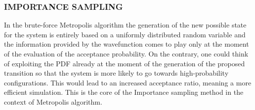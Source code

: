 \subsubsection{IMPORTANCE SAMPLING}
In the brute-force Metropolis algorithm the generation of the new possible state for the system is entirely based on a uniformly distributed random variable and the information provided by the wavefunction comes to play only at the moment of the evaluation of the acceptance probability. On the contrary, one could think of exploiting the PDF already at the moment of the generation of the proposed transition so that the system is more likely to go towards high-probability configurations. This would lead to an increased acceptance ratio, meaning a more efficient simulation. This is the core of the Importance sampling method \cite{hastings} in the context of Metropolis algorithm.


